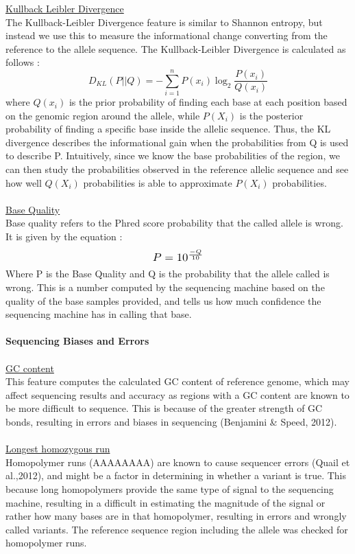 \documentclass{article}
\begin{document}
\underline{Kullback Leibler Divergence}\\
The Kullback-Leibler Divergence feature is similar to Shannon entropy, but instead we use this to measure the informational change converting from the reference to the allele sequence. The Kullback-Leibler Divergence is calculated as follows :
\begin{equation}
D_{KL}(P||Q) = -\sum_{i=1}^{n}P(x_i)\log_{2}{\frac{P(x_i)}{Q(x_i)}}
\end{equation}
where $Q(x_i)$ is the prior probability of finding each base at each position based on the genomic region around the allele, while $P(X_i)$ is the posterior probability of finding a specific base inside the allelic sequence. Thus, the KL divergence describes the informational gain when the probabilities from Q is used to describe P. Intuitively, since we know the base probabilities of the region, we can then study the probabilities observed in the reference allelic sequence and see how well $Q(X_i)$ probabilities is able to approximate $P(X_i)$ probabilities.\\\\
\underline{Base Quality}\\
Base quality refers to the Phred score probability that the called allele is wrong. It is given by the equation :
\[ \scalebox{1.2}{$P=10^{\frac{-Q}{10}}$} \]
Where P is the Base Quality and Q is the probability that the allele called is wrong. This is a number computed by the sequencing machine based on the quality of the base samples provided, and tells us how much confidence the sequencing machine has in calling that base.\\\\
\textbf{Sequencing Biases and Errors} \\\\
\underline{GC content}\\
This feature computes the calculated GC content of reference genome, which may affect sequencing results and accuracy as regions with a GC content are known to be more difficult to sequence. This is because of the greater strength of GC bonds, resulting in errors and biases in sequencing (Benjamini \& Speed, 2012).\\\\ 
\underline{Longest homozygous run}\\
Homopolymer runs (AAAAAAAA) are known to cause sequencer errors (Quail et al.,2012), and might be a factor in determining in whether a variant is true. This because long homopolymers provide the same type of signal to the sequencing machine, resulting in a difficult in estimating the magnitude of the signal or rather how many bases are in that homopolymer, resulting in errors and wrongly called variants. The reference sequence region including the allele was checked for homopolymer runs. \\\\
\end{document}
